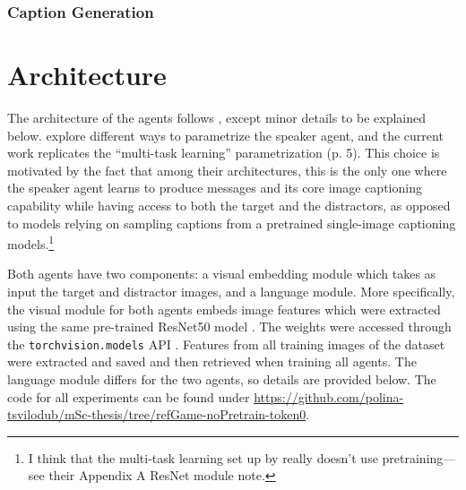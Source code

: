 \subsubsection{Caption Generation}


\section{Architecture}
The architecture of the agents follows \textcite{lazaridou2020multi}, except minor details to be explained below. \textcite{lazaridou2020multi} explore different ways to parametrize the speaker agent, and the current work replicates the ``multi-task learning'' parametrization (p. 5). This choice is motivated by the fact that among their architectures, this is the only one where the speaker agent learns to produce messages and its core image captioning capability while having access to both the target and the distractors, as opposed to models relying on sampling captions from a pretrained single-image captioning models.\footnote{I think that the multi-task learning set up by \textcite{lazaridou2020multi} really doesn't use pretraining---see their Appendix A ResNet module note.} 

Both agents have two components: a visual embedding module which takes as input the target and distractor images, and a language module. More specifically, the visual module for both agents embeds image features which were extracted using the same pre-trained ResNet50 model \parencite{he2016deep}. The weights were accessed through the \texttt{torchvision.models} API \parencite{marcel2010torchvision}. Features from all training images of the dataset were extracted and saved and then retrieved when training all agents. 
The language module differs for the two agents, so details are provided below. 
The code for all experiments can be found under \url{https://github.com/polina-tsvilodub/mSc-thesis/tree/refGame-noPretrain-token0}. 

